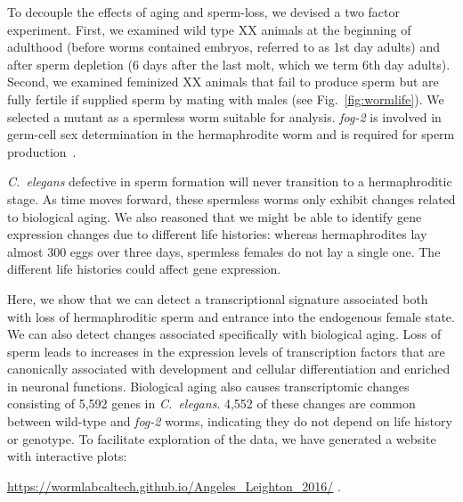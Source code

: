 \documentclass[10pt,letterpaper,twocolumn]{article}
\newcommand{\cel}{\emph{C.~elegans}}
\newcommand{\fog}{\emph{\mbox{fog-2}}}
\newcommand{\agen}{5,592}
\newcommand{\website}{
            \url{https://wormlabcaltech.github.io/Angeles_Leighton_2016/}
            }
\begin{document}
To decouple the effects of aging and sperm-loss, we devised a two factor
experiment. First, we examined wild type XX animals at the beginning of
adulthood (before worms contained embryos, referred to as 1st day adults) and
after sperm depletion (6 days after the last molt, which we term 6th day
adults). Second, we examined feminized XX animals that fail to produce sperm but
are fully fertile if supplied sperm by mating with males (see
Fig.~\ref{fig:wormlife}). We selected a mutant as a spermless worm suitable for
analysis. \fog{} is involved in germ-cell sex determination in the hermaphrodite
worm and is required for sperm production~\cite{Schedl1988,Clifford2000}.

\cel{} defective in sperm formation will never transition to a hermaphroditic
stage. As time moves forward, these spermless worms only exhibit changes
related to biological aging. We also reasoned that we might be able to identify
gene expression changes due to different life histories: whereas hermaphrodites
lay almost 300 eggs over three days, spermless females do not lay a single one.
The different life histories could affect gene expression.

Here, we show that we can detect a transcriptional signature associated both
with loss of hermaphroditic sperm and entrance into the endogenous female state.
We can also detect changes associated specifically with biological aging.
Loss of sperm leads to increases in the expression levels of transcription
factors that are canonically associated with development and cellular
differentiation and enriched in neuronal functions.
Biological aging also causes transcriptomic changes consisting of \agen{} genes
in \cel{}. 4,552 of these changes are common between wild-type and \fog{} worms,
indicating they do not depend on life history or genotype. To facilitate
exploration of the data, we have generated a website with interactive plots:
\website{}.
\end{document}

